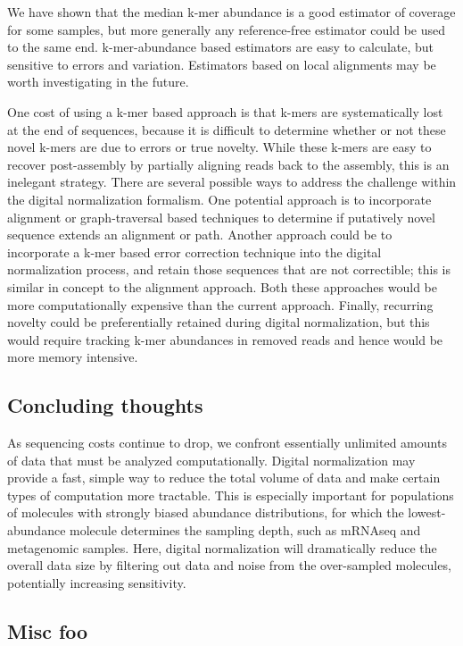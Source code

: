 \documentclass[10pt,draft]{article}
\begin{document}
We have shown that the median k-mer abundance is a good estimator of
coverage for some samples, but more generally any reference-free
estimator could be used to the same end.  k-mer-abundance based
estimators are easy to calculate, but sensitive to errors and
variation.  Estimators based on local alignments may be worth
investigating in the future.

One cost of using a k-mer based approach is that k-mers are
systematically lost at the end of sequences, because it is difficult
to determine whether or not these novel k-mers are due to errors or
true novelty.  While these k-mers are easy to recover post-assembly by
partially aligning reads back to the assembly, this is an inelegant
strategy.  There are several possible ways to address the challenge
within the digital normalization formalism.  One potential approach is
to incorporate alignment or graph-traversal based techniques to
determine if putatively novel sequence extends an alignment or path.
Another approach could be to incorporate a k-mer based error
correction technique into the digital normalization process, and
retain those sequences that are not correctible; this is similar in
concept to the alignment approach.  Both these approaches would be
more computationally expensive than the current approach.  Finally,
recurring novelty could be preferentially retained during digital
normalization, but this would require tracking k-mer abundances in
removed reads and hence would be more memory intensive.

\subsection{Concluding thoughts}

As sequencing costs continue to drop, we confront essentially
unlimited amounts of data that must be analyzed computationally.
Digital normalization may provide a fast, simple way to reduce the
total volume of data and make certain types of computation more
tractable.  This is especially important for populations of molecules
with strongly biased abundance distributions, for which the
lowest-abundance molecule determines the sampling depth, such as
mRNAseq and metagenomic samples.  Here, digital normalization will
dramatically reduce the overall data size by filtering out data and
noise from the over-sampled molecules, potentially increasing
sensitivity.

\subsection{Misc foo}
\end{document}
